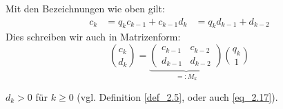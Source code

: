 \begin{falko} \label{F2.6}
	Mit den Bezeichnungen wie oben gilt:
	\begin{equation}
	\begin{aligned}
		c_k &= q_k c_{k-1} + c_{k-1}	\label{eq_2.17}
		d_k &= q_k d_{k-1} + d_{k-2}
	\end{aligned}
	\end{equation}
	Dies schreiben wir auch in Matrizenform:
	\begin{equation}
		\binom{c_k}{d_k} = \underbrace{\begin{pmatrix}
		c_{k-1} & c_{k-2} \\ 
		d_{k-1} & d_{k-2}
		\end{pmatrix}}_{=:M_k} \binom{q_k}{1}
	\end{equation}
\end{falko}

	$d_k > 0$ für $k \geq 0$ (vgl. Definition \ref{def_2.5}, oder auch \eqref{eq_2.17}).
\newpage